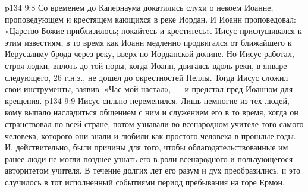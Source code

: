 \vs p134 9:8 \pc Со временем до Капернаума докатились слухи о некоем Иоанне, проповедующем и крестящем кающихся в реке Иордан. И Иоанн проповедовал: «Царство Божие приблизилось; покайтесь и креститесь». Иисус прислушивался к этим известиям, в то время как Иоанн медленно продвигался от ближайшего к Иерусалиму брода через реку, вверх по Иорданской долине. Но Иисус работал, строя лодки, вплоть до той поры, когда Иоанн, двигаясь вдоль реки, в январе следующего, 26 г.н.э., не дошел до окрестностей Пеллы. Тогда Иисус сложил свои инструменты, заявив: «Час мой настал», --- и предстал пред Иоанном для крещения.
\vs p134 9:9 Иисус сильно переменился. Лишь немногие из тех людей, кому выпало насладиться общением с ним и служением его в то время, когда он странствовал по всей стране, потом узнавали во всенародном учителе того самого человека, которого они знали и любили как простого человека в прошлые годы. И, действительно, были причины для того, чтобы облагодательствованные им ранее люди не могли позднее узнать его в роли всенародного и пользующегося авторитетом учителя. В течение долгих лет его разум и дух преобразились, и это случилось в тот исполненный событиями период пребывания на горе Ермон.
